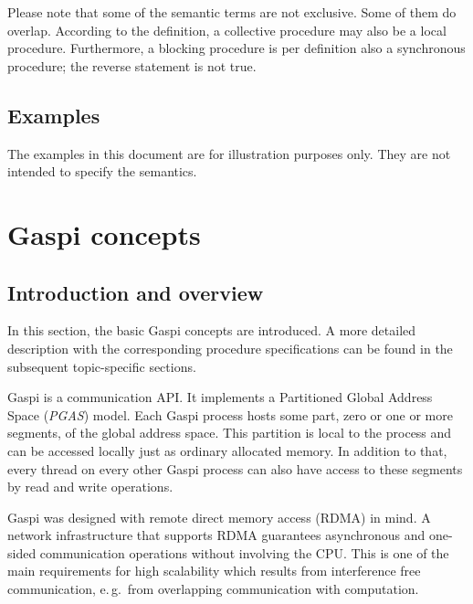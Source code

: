 \documentclass[a4paper]{article}
\newlength{\st}\setlength{\st}{0pt}
\newcommand{\GASPI}{{\sc Gaspi}}
\begin{document}
Please note that some of the semantic terms are not exclusive. Some of
them do overlap. According to the definition, a collective procedure
may also be a local procedure. Furthermore, a blocking procedure is
per definition also a synchronous procedure; the reverse statement is
not true.



\subsection{Examples}

The examples in this document are for illustration purposes only. They are not intended
to specify the semantics.


\section{\GASPI{} concepts}

\subsection{Introduction and overview}

In this section, the basic \GASPI{} concepts are introduced. A more detailed
description with the corresponding procedure specifications can be found
in the subsequent topic-specific sections.

\GASPI{} is a communication API.  It implements a Partitioned Global
Address Space (\emph{PGAS}) model. Each \GASPI{} process hosts some
part, zero or one or more segments, of the global address space. This
partition is local to the process and can be accessed locally just as
ordinary allocated memory. In addition to that, every thread on every
other \GASPI{} process can also have access to these segments by read
and write operations.

\GASPI{} was designed with remote direct memory access (RDMA) in mind.
A network infrastructure that supports RDMA guarantees asynchronous and
one-sided communication operations without involving the CPU. This is
one of the main requirements for high scalability which results from
interference free communication, e.\,g.\ from overlapping communication
with computation.
\end{document}
